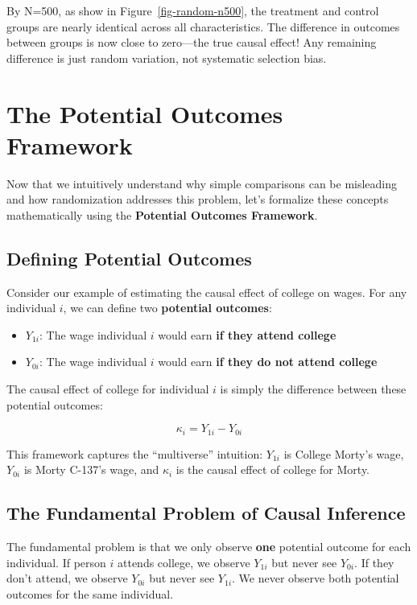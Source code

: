 \documentclass[
  letterpaper,
  DIV=11,
  numbers=noendperiod]{scrreprt}
\providecommand{\tightlist}{%
  \setlength{\itemsep}{0pt}\setlength{\parskip}{0pt}}
\begin{document}
By N=500, as show in Figure~\ref{fig-random-n500}, the treatment and
control groups are nearly identical across all characteristics. The
difference in outcomes between groups is now close to zero---the true
causal effect! Any remaining difference is just random variation, not
systematic selection bias.

\section{The Potential Outcomes
Framework}\label{the-potential-outcomes-framework}

Now that we intuitively understand why simple comparisons can be
misleading and how randomization addresses this problem, let's formalize
these concepts mathematically using the \textbf{Potential Outcomes
Framework}.

\subsection{Defining Potential
Outcomes}\label{defining-potential-outcomes}

Consider our example of estimating the causal effect of college on
wages. For any individual \(i\), we can define two \textbf{potential
outcomes}:

\begin{itemize}
\tightlist
\item
  \(Y_{1i}\): The wage individual \(i\) would earn \textbf{if they
  attend college}
\item
  \(Y_{0i}\): The wage individual \(i\) would earn \textbf{if they do
  not attend college}
\end{itemize}

The causal effect of college for individual \(i\) is simply the
difference between these potential outcomes:

\[
\kappa_i = Y_{1i} - Y_{0i}
\]

This framework captures the ``multiverse'' intuition: \(Y_{1i}\) is
College Morty's wage, \(Y_{0i}\) is Morty C-137's wage, and \(\kappa_i\)
is the causal effect of college for Morty.

\subsection{The Fundamental Problem of Causal
Inference}\label{the-fundamental-problem-of-causal-inference}

The fundamental problem is that we only observe \textbf{one} potential
outcome for each individual. If person \(i\) attends college, we observe
\(Y_{1i}\) but never see \(Y_{0i}\). If they don't attend, we observe
\(Y_{0i}\) but never see \(Y_{1i}\). We never observe both potential
outcomes for the same individual.
\end{document}
